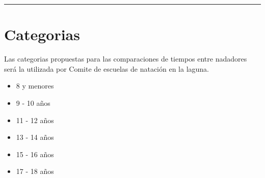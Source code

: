 \hrule
\section{Categorias}
Las categorias propuestas para las comparaciones de tiempos entre nadadores será la utilizada por Comite de escuelas de natación en la laguna.
\begin{multicols}{2}
    \begin{center}
        \begin{itemize}
            \item 8 y menores
            \item 9 - 10 años
            \item 11 - 12 años
            \item 13 - 14 años
            \item 15 - 16 años
            \item 17 - 18 años
        \end{itemize}
    \end{center}
\end{multicols}
